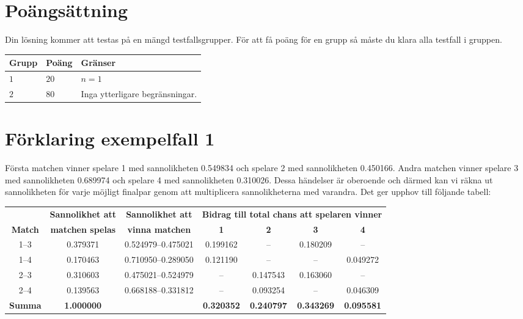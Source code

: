 \section*{Poängsättning}
Din lösning kommer att testas på en mängd testfallsgrupper.
För att få poäng för en grupp så måste du klara alla testfall i gruppen.

\noindent
\begin{tabular}{| l | l | p{12cm} |}
  \hline
  \textbf{Grupp} & \textbf{Poäng} & \textbf{Gränser} \\ \hline
  $1$    & $20$       & $n=1$ \\ \hline
  $2$    & $80$       & Inga ytterligare begränsningar. \\ \hline
\end{tabular}

\section*{Förklaring exempelfall 1}
Första matchen vinner spelare 1 med sannolikheten 0.549834 och spelare 2 med sannolikheten 0.450166.
Andra matchen vinner spelare 3 med sannolikheten 0.689974 och spelare 4 med sannolikheten 0.310026.
Dessa händelser är oberoende och därmed kan vi räkna ut sannolikheten
för varje möjligt finalpar genom att multiplicera sannolikheterna med
varandra. Det ger upphov till följande tabell:

\begin{tabular}{|c|c|c|c|c|c|c|} \hline
 & {\bf Sannolikhet att} & {\bf Sannolikhet att} & \multicolumn{4}{|c|}{\bf Bidrag till total chans att spelaren vinner}  \\
{\bf Match} & {\bf matchen spelas} & {\bf vinna matchen} & {\bf
  1}&{\bf 2}&{\bf 3}&{\bf 4} \\ \hline
1--3 & 0.379371 & 0.524979--0.475021 & 0.199162 & -- & 0.180209 & -- \\
1--4 & 0.170463 & 0.710950--0.289050 & 0.121190 & -- & -- & 0.049272 \\
2--3 & 0.310603 & 0.475021--0.524979 & -- & 0.147543 & 0.163060 & -- \\
2--4 & 0.139563 & 0.668188--0.331812 & -- & 0.093254 & -- & 0.046309 \\ \hline
{\bf Summa }& {\bf 1.000000} &                & {\bf 0.320352} & {\bf 0.240797} & {\bf 0.343269 }& {\bf 0.095581 } \\ \hline
\end{tabular}
